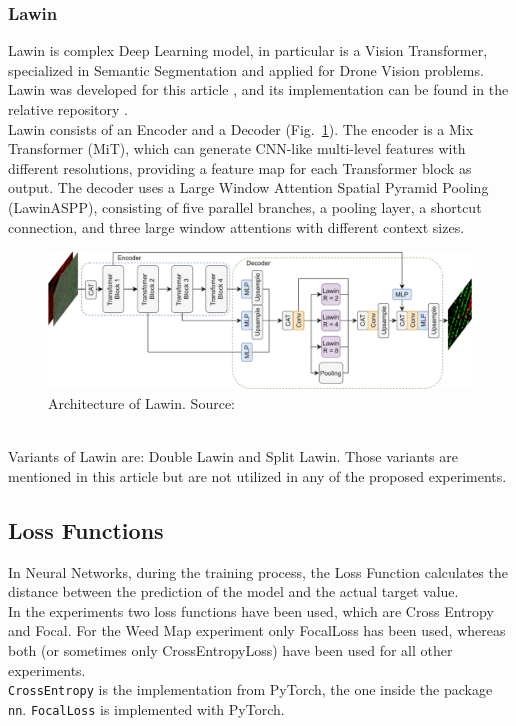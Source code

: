 \subsubsection{Lawin}\label{sec:Lawin-3.4.1.2}

Lawin is complex Deep Learning model, in particular is a Vision Transformer, specialized in Semantic Segmentation and applied for Drone Vision problems.
Lawin was developed for this article \cite{WeedMap-PaperThesis}, and its implementation can be found in the relative repository \cite{WeedMap-Repository}.
% 
\\[0.3cm]Lawin consists of an Encoder and a Decoder (Fig.~\ref{fig:figure-3.4.2}).
The encoder is a Mix Transformer (MiT), which can generate CNN-like multi-level features with different resolutions, providing a feature map for each Transformer block as output.
The decoder uses a Large Window Attention Spatial Pyramid Pooling (LawinASPP), consisting of five parallel branches, a pooling layer, a shortcut connection, and three large window attentions with different context sizes.
\begin{figure}[t]
	\centering
	\includegraphics[width=15cm]{figures/figure-3.4.2.png}
	\caption[Architecture of Lawin]{Architecture of Lawin. Source: \cite{WeedMap-PaperThesis}}
	\label{fig:figure-3.4.2}
\end{figure}
% 
\\[0.3cm]Variants of Lawin are: Double Lawin and Split Lawin.
Those variants are mentioned in this article \cite{WeedMap-PaperThesis} but are not utilized in any of the proposed experiments.

\subsection{Loss Functions}

In Neural Networks, during the training process, the Loss Function calculates the distance between the prediction of the model and the actual target value.
\\[0.3cm]In the experiments two loss functions have been used, which are Cross Entropy and Focal.
For the Weed Map experiment only FocalLoss has been used, whereas both (or sometimes only CrossEntropyLoss) have been used for all other experiments.
\\[0.3cm]\texttt{CrossEntropy} is the implementation from PyTorch, the one inside the package \texttt{nn}. \texttt{FocalLoss} is implemented with PyTorch.

